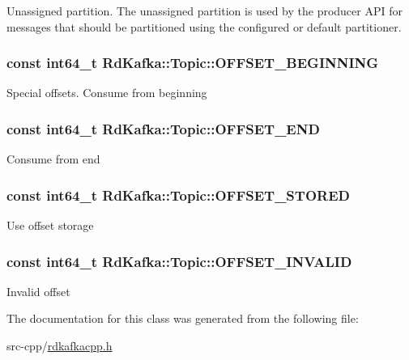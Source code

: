 Unassigned partition. The unassigned partition is used by the producer API for messages that should be partitioned using the configured or default partitioner. \hypertarget{classRdKafka_1_1Topic_a5d3aa07897b2a84dd23aa501318be42a}{
\subsubsection[{OFFSET\_\-BEGINNING}]{\setlength{\rightskip}{0pt plus 5cm}const int64\_\-t {\bf RdKafka::Topic::OFFSET\_\-BEGINNING}}}
\label{classRdKafka_1_1Topic_a5d3aa07897b2a84dd23aa501318be42a}


Special offsets. Consume from beginning \hypertarget{classRdKafka_1_1Topic_ac13c22ede4c3475282e3bd80a4fa969f}{
\subsubsection[{OFFSET\_\-END}]{\setlength{\rightskip}{0pt plus 5cm}const int64\_\-t {\bf RdKafka::Topic::OFFSET\_\-END}}}
\label{classRdKafka_1_1Topic_ac13c22ede4c3475282e3bd80a4fa969f}
Consume from end \hypertarget{classRdKafka_1_1Topic_a94be7a8729b679e1065910acd0cd7fff}{
\subsubsection[{OFFSET\_\-STORED}]{\setlength{\rightskip}{0pt plus 5cm}const int64\_\-t {\bf RdKafka::Topic::OFFSET\_\-STORED}}}
\label{classRdKafka_1_1Topic_a94be7a8729b679e1065910acd0cd7fff}
Use offset storage \hypertarget{classRdKafka_1_1Topic_a01bf1a7bec9ce67de81239d81722237b}{
\subsubsection[{OFFSET\_\-INVALID}]{\setlength{\rightskip}{0pt plus 5cm}const int64\_\-t {\bf RdKafka::Topic::OFFSET\_\-INVALID}}}
\label{classRdKafka_1_1Topic_a01bf1a7bec9ce67de81239d81722237b}
Invalid offset 

The documentation for this class was generated from the following file:\begin{DoxyCompactItemize}
\item 
src-\/cpp/\hyperlink{rdkafkacpp_8h}{rdkafkacpp.h}\end{DoxyCompactItemize}
